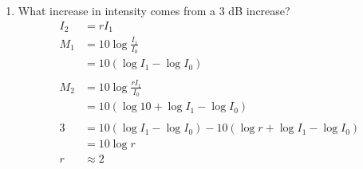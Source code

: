\documentclass{exam}
\begin{document}
\begin{enumerate}
    \item What increase in intensity comes from a 3 dB increase?
      \begin{align*}
        I_2 &= r I_1 \\
        M_1 &= 10 \log \frac{I_1}{I_0} \\
            &= 10 (\log I_1 - \log I_0 ) \\
        \\
        M_2 &= 10 \log \frac{r I_1}{I_0} \\
            &= 10 (\log 10 + \log I_1 - \log I_0 ) \\
        \\
        3   &= 10 (\log I_1 - \log I_0 ) - 10 (\log r + \log I_1 - \log I_0 ) \\
            &= 10 \log r \\
        r   &\approx 2 \\
      \end{align*}

  \end{enumerate}
\end{document}
